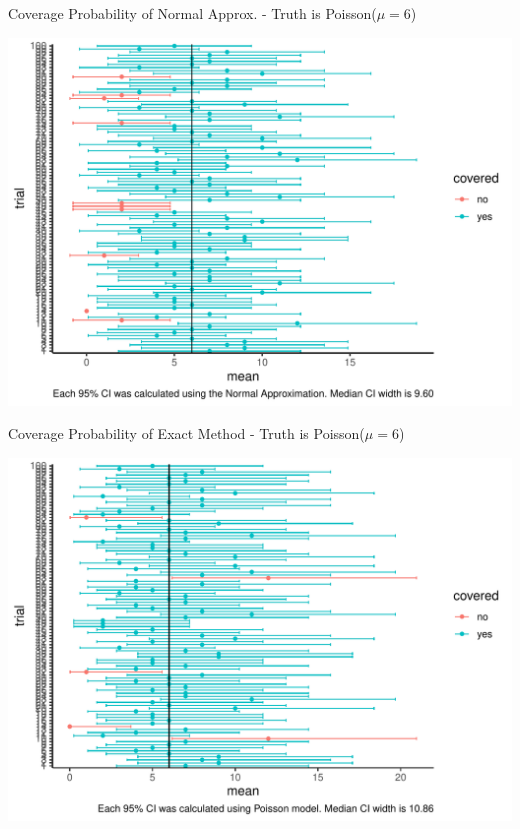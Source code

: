 \documentclass[10pt,handout]{beamer}\usepackage[]{graphicx}\usepackage[]{color}
\makeatletter
\def\maxwidth{ %
  \ifdim\Gin@nat@width>\linewidth
    \linewidth
  \else
    \Gin@nat@width
  \fi
}
\newenvironment{knitrout}{}{} %
\makeatother
\begin{document}
\begin{frame}[fragile]{Coverage Probability of Normal Approx. - Truth is Poisson($\mu=6$)}
	
\begin{knitrout}\tiny
{}\color{fgcolor}

{\centering \includegraphics[width=\maxwidth]{figure/unnamed-chunk-5-1} 

}


\end{knitrout}
	
\end{frame}



\begin{frame}[fragile]{Coverage Probability of Exact Method - Truth is Poisson($\mu=6$)}
	
\begin{knitrout}\tiny
{}\color{fgcolor}

{\centering \includegraphics[width=\maxwidth]{figure/unnamed-chunk-6-1} 

}


\end{knitrout}
	
\end{frame}
\end{document}
